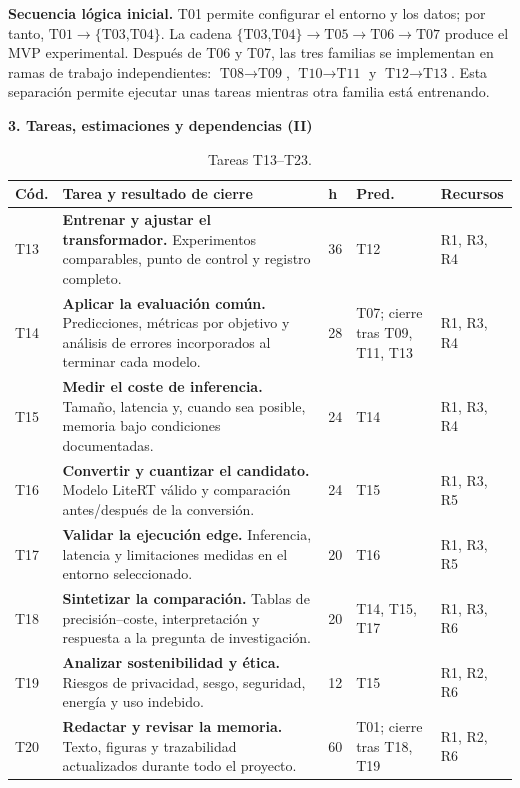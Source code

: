 \documentclass[10pt,a4paper]{article}
\newcommand{\task}[1]{\textbf{#1}}
\begin{document}
\textbf{Secuencia lógica inicial.} T01 permite configurar el entorno y los datos; por tanto, \(\text{T01}\rightarrow\{\text{T03,T04}\}\). La cadena \(\{\text{T03,T04}\}\rightarrow\text{T05}\rightarrow\text{T06}\rightarrow\text{T07}\) produce el MVP experimental. Después de T06 y T07, las tres familias se implementan en ramas de trabajo independientes: \(\text{T08}\rightarrow\text{T09}\), \(\text{T10}\rightarrow\text{T11}\) y \(\text{T12}\rightarrow\text{T13}\). Esta separación permite ejecutar unas tareas mientras otra familia está entrenando.

\newpage
{\color{deepblue}\Large\bfseries 3. Tareas, estimaciones y dependencias (II)}

\begin{table}[h]
\centering
\caption{Tareas T13--T23.}
\scriptsize
\begin{tabularx}{\textwidth}{C{0.9cm}Y C{0.65cm} L{1.65cm} L{1.85cm}}
\toprule
\textbf{Cód.} & \textbf{Tarea y resultado de cierre} & \textbf{h} & \textbf{Pred.} & \textbf{Recursos} \\
\midrule
T13 & \task{Entrenar y ajustar el transformador.} Experimentos comparables, punto de control y registro completo. & 36 & T12 & R1, R3, R4 \\
T14 & \task{Aplicar la evaluación común.} Predicciones, métricas por objetivo y análisis de errores incorporados al terminar cada modelo. & 28 & T07; cierre tras T09, T11, T13 & R1, R3, R4 \\
T15 & \task{Medir el coste de inferencia.} Tamaño, latencia y, cuando sea posible, memoria bajo condiciones documentadas. & 24 & T14 & R1, R3, R4 \\
T16 & \task{Convertir y cuantizar el candidato.} Modelo LiteRT válido y comparación antes/después de la conversión. & 24 & T15 & R1, R3, R5 \\
T17 & \task{Validar la ejecución edge.} Inferencia, latencia y limitaciones medidas en el entorno seleccionado. & 20 & T16 & R1, R3, R5 \\
T18 & \task{Sintetizar la comparación.} Tablas de precisión--coste, interpretación y respuesta a la pregunta de investigación. & 20 & T14, T15, T17 & R1, R3, R6 \\
T19 & \task{Analizar sostenibilidad y ética.} Riesgos de privacidad, sesgo, seguridad, energía y uso indebido. & 12 & T15 & R1, R2, R6 \\
T20 & \task{Redactar y revisar la memoria.} Texto, figuras y trazabilidad actualizados durante todo el proyecto. & 60 & T01; cierre tras T18, T19 & R1, R2, R6 \\

\end{tabularx}
\end{table}
\end{document}
